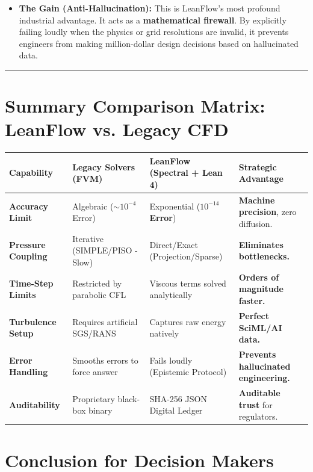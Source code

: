 \documentclass[11pt,a4paper]{article}
\begin{document}
\begin{itemize}
    \item \textbf{The Gain (Anti-Hallucination):} This is LeanFlow's most profound industrial advantage. It acts as a \textbf{mathematical firewall}. By explicitly failing loudly when the physics or grid resolutions are invalid, it prevents engineers from making million-dollar design decisions based on hallucinated data.
\end{itemize}

\vspace{0.5cm}
\hrule
\vspace{0.5cm}

\section*{Summary Comparison Matrix: LeanFlow vs. Legacy CFD}

\begin{table}[h]
\centering
\begin{tabularx}{\textwidth}{l X X X}
\toprule
\textbf{Capability} & \textbf{Legacy Solvers (FVM)} & \textbf{LeanFlow (Spectral + Lean 4)} & \textbf{Strategic Advantage} \\
\midrule
\textbf{Accuracy Limit} & Algebraic ($\sim 10^{-4}$ Error) & Exponential (\textbf{$10^{-14}$ Error}) & \textbf{Machine precision}, zero diffusion. \\
\textbf{Pressure Coupling} & Iterative (SIMPLE/PISO - Slow) & Direct/Exact (Projection/Sparse) & \textbf{Eliminates bottlenecks.} \\
\textbf{Time-Step Limits} & Restricted by parabolic CFL & Viscous terms solved analytically & \textbf{Orders of magnitude faster.} \\
\textbf{Turbulence Setup} & Requires artificial SGS/RANS & Captures raw energy natively & \textbf{Perfect SciML/AI data.} \\
\textbf{Error Handling} & Smooths errors to force answer & Fails loudly (Epistemic Protocol) & \textbf{Prevents hallucinated engineering.} \\
\textbf{Auditability} & Proprietary black-box binary & SHA-256 JSON Digital Ledger & \textbf{Auditable trust} for regulators. \\
\bottomrule
\end{tabularx}
\end{table}

\section*{Conclusion for Decision Makers}
\end{document}
